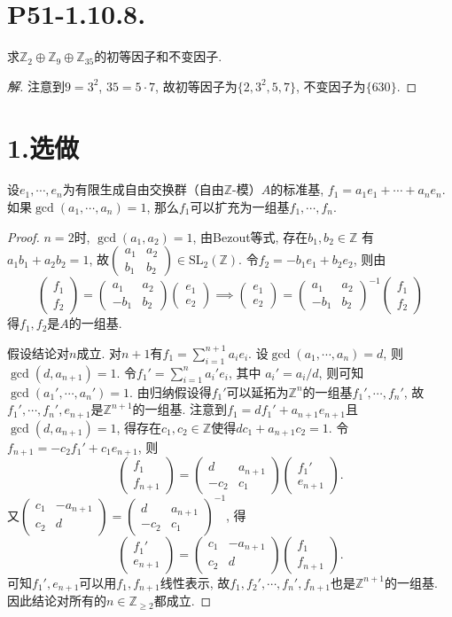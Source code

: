 \documentclass[12pt, a4paper, fontset=windows]{ctexart}
\newcommand{\Z}{\mathbb{Z}}
\newcommand{\SL}{\mathrm{SL}}
\newcommand{\kh}[1]{（{#1}）} %
\newcommand{\xuan}{{\normalsize 选做}}
\def\pmat#1{\begin{pmatrix}#1\end{pmatrix}}
\newenvironment{solution}{\begin{proof}[解]}{\end{proof}}
\begin{document}
\section*{P51-1.10.8.}

求$\Z_2\oplus\Z_9\oplus\Z_{35}$的初等因子和不变因子. 

\begin{solution}
注意到$9=3^2$, $35=5\cdot 7$, 故初等因子为$\{2,3^2,5,7\}$, 不变因子为$\{630\}$. 
\end{solution}

\section*{1.\xuan}
\label{basis-ext}

设$e_1,\cdots,e_n$为有限生成自由交换群\kh{自由$\Z$-模}$A$的标准基, $f_1=a_1e_1+\cdots+a_ne_n$. 
如果$\gcd(a_1,\cdots,a_n)=1$, 那么$f_1$可以扩充为一组基$f_1,\cdots,f_n$. 

\begin{proof}
$n=2$时, $\gcd(a_1,a_2)=1$, 由Bezout等式, 存在$b_1,b_2\in\Z$
有$a_1b_1+a_2b_2=1$, 故$\pmat{a_1&a_2\\b_1&b_2}\in\SL_2(\Z)$. 
令$f_2=-b_1e_1+b_2e_2$, 则由
\[\pmat{f_1\\f_2}=\pmat{a_1&a_2\\-b_1&b_2}\pmat{e_1\\e_2}\implies\pmat{e_1\\e_2}=\pmat{a_1&a_2\\-b_1&b_2}^{-1}\pmat{f_1\\f_2}\]
得$f_1,f_2$是$A$的一组基. 

假设结论对$n$成立. 对$n+1$有$f_1=\sum^{n+1}_{i=1}a_ie_i$. 
设$\gcd(a_1,\cdots,a_n)=d$, 则
$\gcd(d,a_{n+1})=1$. 令$f_1'=\sum^n_{i=1}a_i'e_i$, 其中
$a_i'=a_i/d$, 则可知$\gcd(a_1',\cdots,a_n')=1$. 
由归纳假设得$f_1'$可以延拓为$\Z^n$的一组基$f_1',\cdots,f_n'$, 
故$f_1',\cdots,f_n',e_{n+1}$是$\Z^{n+1}$的一组基. 
注意到$f_1=df_1'+a_{n+1}e_{n+1}$且$\gcd(d,a_{n+1})=1$, 
得存在$c_1,c_2\in\Z$使得$dc_1+a_{n+1}c_2=1$. 
令$f_{n+1}=-c_2f_1'+c_1e_{n+1}$, 则
\[\pmat{f_1\\f_{n+1}}=\pmat{d&a_{n+1}\\-c_2&c_1}\pmat{f_1'\\e_{n+1}}.\]
又$\pmat{c_1&-a_{n+1}\\c_2&d}=\pmat{d&a_{n+1}\\-c_2&c_1}^{-1}$, 得
\[\pmat{f_1'\\e_{n+1}}=\pmat{c_1&-a_{n+1}\\c_2&d}\pmat{f_1\\f_{n+1}}.\]
可知$f_1',e_{n+1}$可以用$f_1,f_{n+1}$线性表示, 
故$f_1,f_2',\cdots,f_n',f_{n+1}$也是$\Z^{n+1}$的一组基. 
因此结论对所有的$n\in\Z_{\ge 2}$都成立. 
\end{proof}
\end{document}
